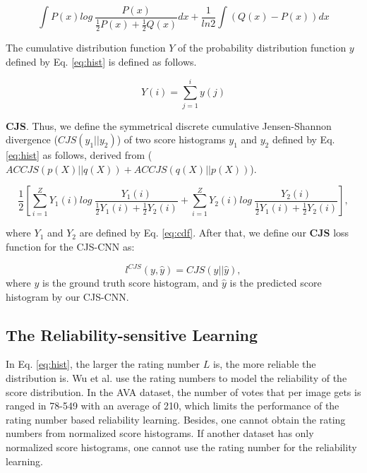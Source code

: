 \documentclass[letterpaper]{article} %
\begin{document}
\begin{small}
\begin{equation}
\int P(x)log~\frac{P(x)}{\frac{1}{2}P(x)+\frac{1}{2}Q(x)}dx + \frac{1}{ln2} \int (Q(x)-P(x))dx
\end{equation}
\label{eq:ASCJS}
\end{small}

The cumulative distribution function $Y$ of the probability distribution function $y$ defined by Eq. \ref{eq:hist} is defined as follows.

\begin{equation}
Y(i) = \sum_{j=1}^{i} y(j)
\label{eq:cdf}
\end{equation}

\textbf{CJS}. Thus, we define the symmetrical discrete cumulative Jensen-Shannon divergence ($CJS(y_1||y_2)$) of two score histograms $y_1$ and $y_2$ defined by Eq. \ref{eq:hist} as follows, derived from ($ACCJS(p(X)||q(X))+ACCJS(q(X)||p(X))$).

\begin{small}
\begin{equation}
\frac{1}{2}
[
\sum_{i=1}^{Z}Y_1(i)log~\frac{Y_1(i)}{\frac{1}{2}Y_1(i)+\frac{1}{2}Y_2(i)}
+
\sum_{i=1}^{Z}Y_2(i)log~\frac{Y_2(i)}{\frac{1}{2}Y_1(i)+\frac{1}{2}Y_2(i)}
],
\end{equation}
\end{small}
\label{eq:D-CJS}
where $Y_1$ and $Y_2$ are defined by Eq. \ref{eq:cdf}. After that, we define our \textbf{CJS} loss function for the CJS-CNN as:

\begin{equation}
l^{CJS}(y,\hat{y}) = CJS(y||\hat{y}),
\label{eq:CJS}
\end{equation}
where $y$ is the ground truth score histogram, and $\hat{y}$ is the predicted score histogram by our CJS-CNN.

\subsection{The Reliability-sensitive Learning}
In Eq. \ref{eq:hist}, the larger the rating number $L$ is, the more reliable the distribution is. Wu et al. \cite{WuICCV2011} use the rating numbers to model the reliability of the score distribution. In the AVA dataset, the number of votes that per image gets is ranged in 78-549 with an average of 210, which limits the performance of the rating number based reliability learning. Besides, one cannot obtain the rating numbers from normalized score histograms. If another dataset has only normalized score histograms, one cannot use the rating number for the reliability learning.
\end{document}
